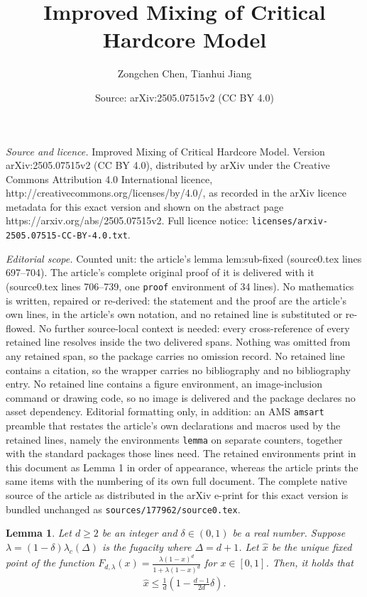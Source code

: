 \documentclass[10pt,a4paper]{amsart}
\title{Improved Mixing of Critical Hardcore Model}
\author{Zongchen Chen, Tianhui Jiang}
\date{Source: arXiv:2505.07515v2 (CC BY 4.0)}
\newtheorem{lemma}{Lemma}
\newcommand{\tp}{\tuple}
\newcommand{\tuple}[1]{\left(#1\right)}
\begin{document}
\maketitle

\noindent\emph{Source and licence.} Improved Mixing of Critical Hardcore Model. Version arXiv:2505.07515v2 (CC BY 4.0), distributed by arXiv under the Creative Commons Attribution 4.0 International licence, http://creativecommons.org/licenses/by/4.0/, as recorded in the arXiv licence metadata for this exact version and shown on the abstract page https://arxiv.org/abs/2505.07515v2. Full licence notice: \texttt{licenses/arxiv-2505.07515-CC-BY-4.0.txt}.\par\smallskip

\noindent\textit{Editorial scope.} Counted unit: the article's lemma lem:sub-fixed (source0.tex lines 697--704). The article's complete original proof of it is delivered with it (source0.tex lines 706--739, one \texttt{proof} environment of 34 lines). No mathematics is written, repaired or re-derived: the statement and the proof are the article's own lines, in the article's own notation, and no retained line is substituted or re-flowed.  No further source-local context is needed: every cross-reference of every retained line resolves inside the two delivered spans.  Nothing was omitted from any retained span, so the package carries no omission record.  No retained line contains a citation, so the wrapper carries no bibliography and no bibliography entry.  No retained line contains a figure environment, an image-inclusion command or drawing code, so no image is delivered and the package declares no asset dependency.  Editorial formatting only, in addition: an AMS \texttt{amsart} preamble that restates the article's own declarations and macros used by the retained lines, namely the environments \texttt{lemma} on separate counters, together with the standard packages those lines need.  The retained environments print in this document as Lemma 1 in order of appearance, whereas the article prints the same items with the numbering of its own full document.  The complete native source of the article as distributed in the arXiv e-print for this exact version is bundled unchanged as \texttt{sources/177962/source0.tex}.
\begin{lemma} \label{lem:sub-fixed}
    Let $d \ge 2$ be an integer and $\delta \in (0,1)$ be a real number. Suppose $\lambda = (1-\delta) \lambda_c(\Delta)$ is the fugacity where $\Delta = d+1$.
    Let $\hat x$ be the unique fixed point of the function $F_{d,\lambda}(x) = \frac{\lambda(1-x)^d}{1+\lambda(1-x)^d}$ for $x\in[0,1]$.
    Then, it holds that
    \begin{align*}
        \hat x\leq \frac{1}{d}\tp{1-\frac{d-1}{2d}\delta}.
    \end{align*}
\end{lemma}
\end{document}

